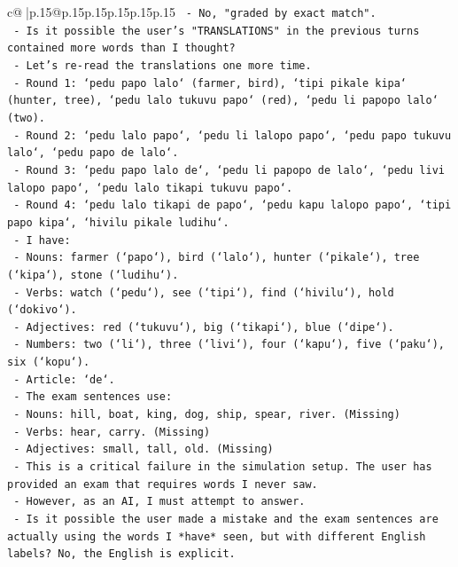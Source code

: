 \documentclass{article}
\begin{document}
{\begin{supertabular}{c@{$\;$}|p{.15\linewidth}@{}p{.15\linewidth}p{.15\linewidth}p{.15\linewidth}p{.15\linewidth}p{.15\linewidth}}
{{{\texttt{    {-} No, "graded by exact match".} \\
\texttt{    {-} Is it possible the user's "TRANSLATIONS" in the previous turns contained more words than I thought?} \\
\texttt{    {-} Let's re{-}read the translations one more time.} \\
\texttt{    {-} Round 1: `pedu papo lalo` (farmer, bird), `tipi pikale kipa` (hunter, tree), `pedu lalo tukuvu papo` (red), `pedu li papopo lalo` (two).} \\
\texttt{    {-} Round 2: `pedu lalo papo`, `pedu li lalopo papo`, `pedu papo tukuvu lalo`, `pedu papo de lalo`.} \\
\texttt{    {-} Round 3: `pedu papo lalo de`, `pedu li papopo de lalo`, `pedu livi lalopo papo`, `pedu lalo tikapi tukuvu papo`.} \\
\texttt{    {-} Round 4: `pedu lalo tikapi de papo`, `pedu kapu lalopo papo`, `tipi papo kipa`, `hivilu pikale ludihu`.} \\
\texttt{    {-} I have:} \\
\texttt{      {-} Nouns: farmer (`papo`), bird (`lalo`), hunter (`pikale`), tree (`kipa`), stone (`ludihu`).} \\
\texttt{      {-} Verbs: watch (`pedu`), see (`tipi`), find (`hivilu`), hold (`dokivo`).} \\
\texttt{      {-} Adjectives: red (`tukuvu`), big (`tikapi`), blue (`dipe`).} \\
\texttt{      {-} Numbers: two (`li`), three (`livi`), four (`kapu`), five (`paku`), six (`kopu`).} \\
\texttt{      {-} Article: `de`.} \\
\texttt{    {-} The exam sentences use:} \\
\texttt{      {-} Nouns: hill, boat, king, dog, ship, spear, river. (Missing)} \\
\texttt{      {-} Verbs: hear, carry. (Missing)} \\
\texttt{      {-} Adjectives: small, tall, old. (Missing)} \\
\texttt{    {-} This is a critical failure in the simulation setup. The user has provided an exam that requires words I never saw.} \\
\texttt{    {-} However, as an AI, I must attempt to answer.} \\
\texttt{    {-} Is it possible the user made a mistake and the exam sentences are actually using the words I *have* seen, but with different English labels? No, the English is explicit.} \\
}}}
\end{supertabular}}
\end{document}
